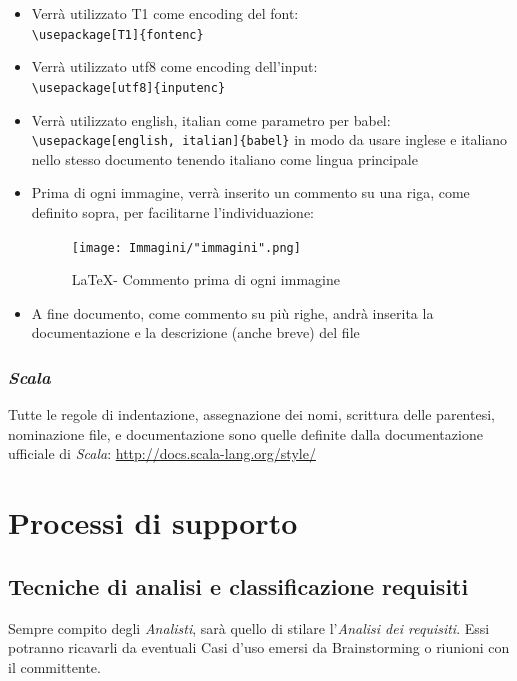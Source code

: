\documentclass[a4paper]{article}
\begin{document}
\begin{itemize}
			verranno comunque indentate le parti innestate al loro interno come segue:
			\begin{figure}[H]
				\centering
				\texttt{[image: Immagini/"indent2".png]}
				\caption{\LaTeX \space - Indentazione 2}
			\end{figure}
			\item Verrà utilizzato T1 come encoding del font: \\ \verb|\usepackage[T1]{fontenc}|
			\item Verrà utilizzato utf8 come encoding dell'input: \\ \verb|\usepackage[utf8]{inputenc}|
			\item Verrà utilizzato english, italian come parametro per babel: \\
			\verb|\usepackage[english, italian]{babel}| in modo da usare inglese e italiano nello
			stesso documento tenendo italiano come lingua principale
			\item Prima di ogni immagine, verrà inserito un commento su una riga, come definito
			sopra, per facilitarne l'individuazione:
			\begin{figure}[H]
				\centering
				\texttt{[image: Immagini/"immagini".png]}
				\caption{\LaTeX \space - Commento prima di ogni immagine}
			\end{figure}
			\item A fine documento, come commento su più righe, andrà inserita la documentazione e la descrizione (anche breve) del file
		\end{itemize}
		
		\subsubsection{\emph{Scala}}
		Tutte le regole di indentazione, assegnazione dei nomi, scrittura delle parentesi, nominazione file, e documentazione sono quelle
		definite dalla documentazione ufficiale di \emph{Scala}: \url{http://docs.scala-lang.org/style/}

	\newpage
	\section{Processi di supporto}
	
		\subsection{Tecniche di analisi e classificazione requisiti}
			Sempre compito degli \emph{Analisti}, sarà quello di stilare l'\emph{Analisi dei requisiti}. Essi potranno ricavarli
			da eventuali Casi d'uso emersi da Brainstorming o riunioni con il committente.
	
\end{document}
